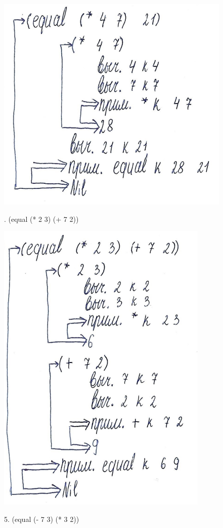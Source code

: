 \documentclass[12pt]{report}
\begin{document}
\includegraphics[scale=1]{img/1.3}


. (equal (* 2 3) (+ 7 2))

\includegraphics[scale=1]{img/1.4}


5. (equal (- 7 3) (* 3 2))
\end{document}

